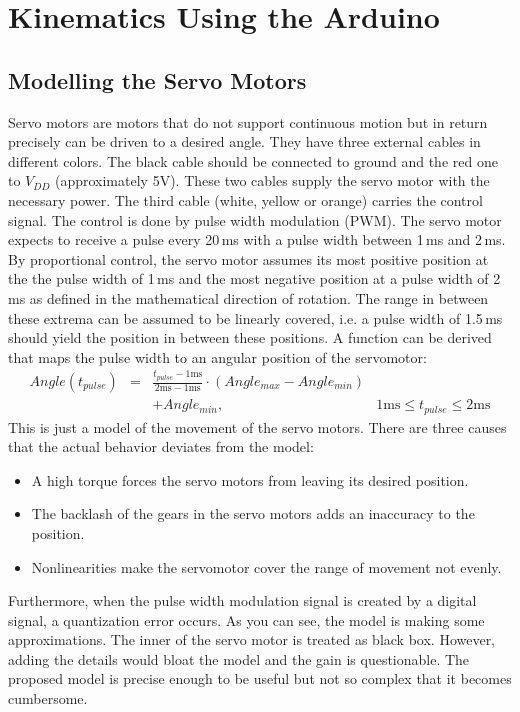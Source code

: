 \documentclass{sig-alternate-05-2015}
\begin{document}
\section{Kinematics Using the Arduino}
\subsection{Modelling the Servo Motors}
Servo motors are motors that do not support continuous motion but in return precisely can be driven to a desired angle. They have three external cables in different colors. The black cable should be connected to ground and the red one to $V_{DD}$ (approximately 5V). These two cables supply the servo motor with the necessary power. The third cable (white, yellow or orange) carries the control signal. The control is done by pulse width modulation (PWM). The servo motor expects to receive a pulse every 20\,ms with a pulse width between 1\,ms and 2\,ms. By proportional control, the servo motor assumes its most positive position at the the pulse width of 1\,ms and the most negative position at a pulse width of 2\,ms as defined in the mathematical direction of rotation. The range in between these extrema can be assumed to be linearly covered, i.e. a pulse width of 1.5\,ms should yield the position in between these positions. A function can be derived that maps the pulse width to an angular position of the servomotor:
\begin{eqnarray}
Angle(t_{pulse}) &=& \frac{t_{pulse} -1 \text{ms} }{2 \text{ms}-1 \text{ms}}\cdot \left(Angle_{max}-Angle_{min}\right)&\nonumber \\ &&+Angle_{min},&1 \text{ms}\le t_{pulse}\le 2 \text{ms}  \nonumber
\end{eqnarray}
This is just a model of the movement of the servo motors. There are three causes that the actual behavior deviates from the model:
\begin{itemize}
	\item A high torque forces the servo motors from leaving its desired position.
	\item The backlash of the gears in the servo motors adds an inaccuracy to the position.
	\item Nonlinearities make the servomotor cover the range of movement not evenly.
\end{itemize}
Furthermore, when the pulse width modulation signal is created by a digital signal, a quantization error occurs.
As you can see, the model is making some approximations. The inner of the servo motor is treated as black box. However, adding the details would bloat the model and the gain is questionable. The proposed model is precise enough to be useful but not so complex that it becomes cumbersome.
\end{document}
